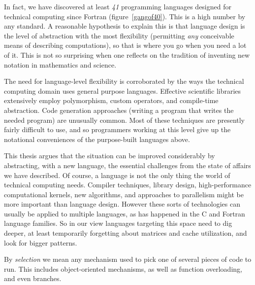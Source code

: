 In fact, we have discovered at least \emph{41} programming languages
designed for technical computing since Fortran (figure~\ref{gangof40}).
This is a high number by any standard. A reasonable hypothesis to
explain this is that language design is the level of abstraction with
the most flexibility (permitting \emph{any} conceivable means of
describing computations), so that is where you go when you need a lot
of it. This is not so surprising when one reflects on the tradition
of inventing new notation in mathematics and science.

The need for language-level flexibility is corroborated by
the ways the technical computing domain uses general purpose
languages.
Effective scientific libraries extensively employ
polymorphism, custom operators, and compile-time abstraction.
Code generation approaches (writing a program that writes the needed
program) are unusually common.
Most of these techniques are presently fairly difficult to use, and so
programmers working at this level give up the notational conveniences
of the purpose-built languages above.



This thesis argues that the situation can be improved considerably by
abstracting, with a new language, the essential challenges from the state
of affairs we have described.
Of course, a language is not the only thing the world of technical
computing needs.
Compiler techniques, library design, high-performance
computational kernels, new algorithms, and approaches to parallelism might
be more important than language design.
However these sorts of technologies can usually be applied to multiple
languages, as has happened in the C and Fortran language families.
So in our view languages targeting this space need to dig deeper,
at least temporarily forgetting about matrices and cache utilization,
and look for bigger patterns.


By \emph{selection} we mean any mechanism used to pick one of several
pieces of code to run. This includes object-oriented mechanisms, as well
as function overloading, and even branches.

